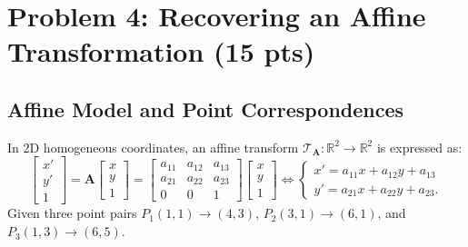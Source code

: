 \documentclass[11pt,a4paper]{article}
\begin{document}
\section{Problem 4: Recovering an Affine Transformation (15 pts)}

\subsection{Affine Model and Point Correspondences}
In 2D homogeneous coordinates, an affine transform $\mathcal{T}_{\mathbf{A}}: \mathbb{R}^2 \to \mathbb{R}^2$ is expressed as:
\begin{equation}
\begin{bmatrix} x' \\ y' \\ 1 \end{bmatrix} = \mathbf{A} \begin{bmatrix} x \\ y \\ 1 \end{bmatrix} = \begin{bmatrix} a_{11} & a_{12} & a_{13} \\ a_{21} & a_{22} & a_{23} \\ 0 & 0 & 1 \end{bmatrix} \begin{bmatrix} x \\ y \\ 1 \end{bmatrix} \iff
\begin{cases}
x' = a_{11} x + a_{12} y + a_{13} \\
y' = a_{21} x + a_{22} y + a_{23}.
\end{cases}
\end{equation}
Given three point pairs $P_1(1, 1) \to (4, 3)$, $P_2(3, 1) \to (6, 1)$, and $P_3(1, 3) \to (6, 5)$.
\end{document}
